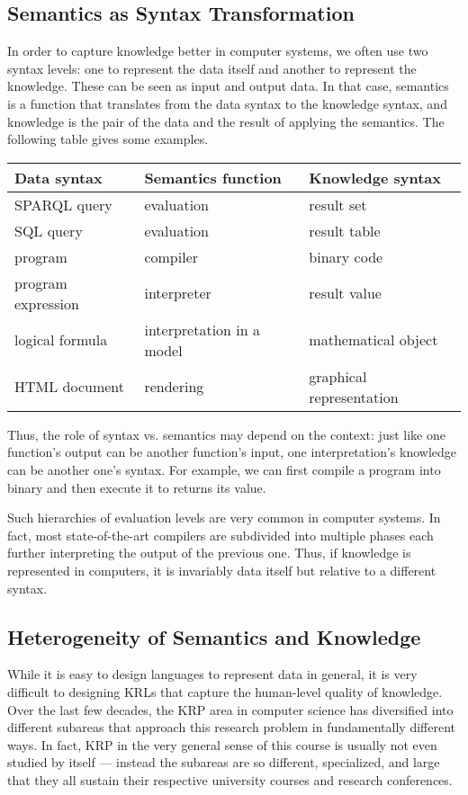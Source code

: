 \subsection{Semantics as Syntax Transformation}

In order to capture knowledge better in computer systems, we often use two syntax levels: one to represent the data itself and another to represent the knowledge.
These can be seen as input and output data.
In that case, semantics is a function that translates from the data syntax to the knowledge syntax, and knowledge is the pair of the data and the result of applying the semantics.
The following table gives some examples.

\begin{center}
\begin{tabular}{l|l|l}
Data syntax & Semantics function & Knowledge syntax \\
\hline
SPARQL query & evaluation & result set \\
SQL query & evaluation & result table \\
program & compiler & binary code \\
program expression & interpreter & result value \\ 
logical formula & interpretation in a model & mathematical object \\
HTML document & rendering & graphical representation 
\end{tabular}
\end{center}

Thus, the role of syntax vs. semantics may depend on the context: just like one function's output can be another function's input, one interpretation's knowledge can be another one's syntax.
For example, we can first compile a program into binary and then execute it to returns its value.

Such hierarchies of evaluation levels are very common in computer systems.
In fact, most state-of-the-art compilers are subdivided into multiple phases each further interpreting the output of the previous one.
Thus, if knowledge is represented in computers, it is invariably data itself but relative to a different syntax.

\subsection{Heterogeneity of Semantics and Knowledge}

While it is easy to design languages to represent data in general, it is very difficult to designing KRLs that capture the human-level quality of knowledge.
Over the last few decades, the KRP area in computer science has diversified into different subareas that approach this research problem in fundamentally different ways.
In fact, KRP in the very general sense of this course is usually not even studied by itself --- instead the subareas are so different, specialized, and large that they all sustain their respective university courses and research conferences.

